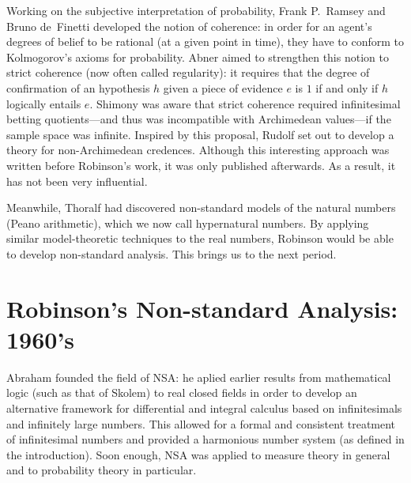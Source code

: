Working on the subjective interpretation of probability, Frank P.\ Ramsey and Bruno de~Finetti developed the notion of coherence: in order for an agent's degrees of belief to be rational (at a given point in time), they have to conform to Kolmogorov's axioms for probability. Abner \citet{Shimony:1955} aimed to strengthen this notion to strict coherence (now often called regularity): it requires that the degree of confirmation of an hypothesis $h$ given a piece of evidence $e$ is $1$ if and only if $h$ logically entails $e$. Shimony was aware that strict coherence required infinitesimal betting quotients---and thus was incompatible with Archimedean values---if the sample space was infinite. Inspired by this proposal, Rudolf \citet{Carnap:1980} set out to develop a theory for non-Archimedean credences. Although this interesting approach was written before Robinson's work, it was only published afterwards. As a result, it has not been very influential.

Meanwhile, Thoralf \citet{Skolem:1934} had discovered non-standard models of the natural numbers (Peano arithmetic), which we now call hypernatural numbers. By applying similar model-theoretic techniques to the real numbers, Robinson would be able to develop non-standard analysis. This brings us to the next period.

\section{Robinson's Non-standard Analysis: 1960's}
Abraham \citet{Robinson:1961,Robinson:1966} founded the field of NSA: he aplied earlier results from mathematical logic (such as that of Skolem) to real closed fields in order to develop an alternative framework for differential and integral calculus based on infinitesimals and infinitely large numbers. This allowed for a formal and consistent treatment of infinitesimal numbers and provided a harmonious number system (as defined in the introduction). Soon enough, NSA was applied to measure theory in general and to probability theory in particular.

